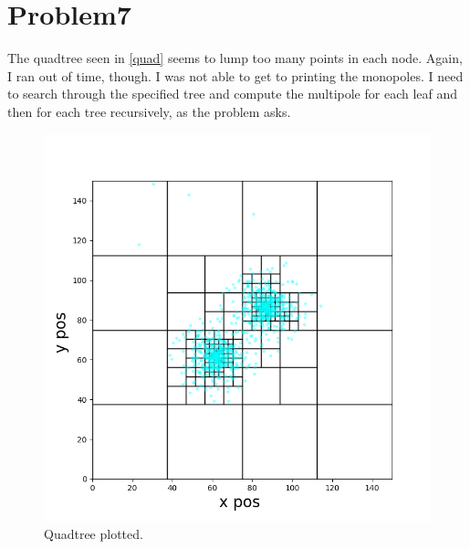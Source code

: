 \section{Problem7}



The quadtree seen in \autoref{quad} seems to lump too many points in each
node. Again, I ran out of time, though. I was not able to get to printing
the monopoles. I need to search through the specified tree and compute
the multipole for each leaf and then for each tree recursively, as the
problem asks.
\begin{figure}[h!]
    \centering
    \includegraphics[width=0.9\linewidth]{./plots/quadtree.png}
    \caption{Quadtree plotted.}
    \label{quad}
\end{figure}
